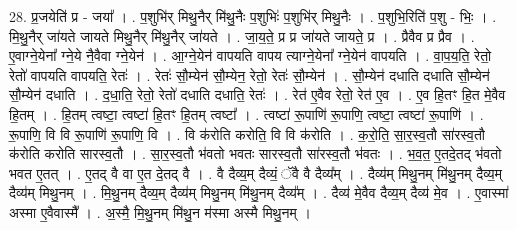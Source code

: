 \documentclass[17pt]{extarticle}
\begin{document}
28. प्र॒जयेति॑ प्र - जया᳚ । . प॒शुभि॑र् मिथु॒नैर् मि॑थु॒नैः प॒शुभिः॑ प॒शुभि॑र् मिथु॒नैः । . प॒शुभि॒रिति॑ प॒शु - भिः॒ । . मि॒थु॒नैर् जा॑यते जायते मिथु॒नैर् मि॑थु॒नैर् जा॑यते । . जा॒य॒ते॒ प्र प्र जा॑यते जायते॒ प्र । . प्रैवैव प्र प्रैव । . ए॒वाग्ने॒येना᳚ ग्ने॒ये नै॒वैवा ग्ने॒येन॑ । . आ॒ग्ने॒येन॑ वापयति वापय त्याग्ने॒येना᳚ ग्ने॒येन॑ वापयति । . वा॒प॒य॒ति॒ रेतो॒ रेतो॑ वापयति वापयति॒ रेतः॑ । . रेतः॑ सौ॒म्येन॑ सौ॒म्येन॒ रेतो॒ रेतः॑ सौ॒म्येन॑ । . सौ॒म्येन॑ दधाति दधाति सौ॒म्येन॑ सौ॒म्येन॑ दधाति । . द॒धा॒ति॒ रेतो॒ रेतो॑ दधाति दधाति॒ रेतः॑ । . रेत॑ ए॒वैव रेतो॒ रेत॑ ए॒व । . ए॒व हि॒तꣳ हि॒त मे॒वैव हि॒तम् । . हि॒तम् त्वष्टा॒ त्वष्टा॑ हि॒तꣳ हि॒तम् त्वष्टा᳚ । . त्वष्टा॑ रू॒पाणि॑ रू॒पाणि॒ त्वष्टा॒ त्वष्टा॑ रू॒पाणि॑ । . रू॒पाणि॒ वि वि रू॒पाणि॑ रू॒पाणि॒ वि । . वि क॑रोति करोति॒ वि वि क॑रोति । . क॒रो॒ति॒ सा॒र॒स्व॒तौ सा॑रस्व॒तौ क॑रोति करोति सारस्व॒तौ । . सा॒र॒स्व॒तौ भ॑वतो भवतः सारस्व॒तौ सा॑रस्व॒तौ भ॑वतः । . भ॒व॒त॒ ए॒तदे॒तद् भ॑वतो भवत ए॒तत् । . ए॒तद् वै वा ए॒त दे॒तद् वै । . वै दैव्य॒म् दैव्यं॒ ॅवै वै दैव्य᳚म् । . दैव्य॑म् मिथु॒नम् मि॑थु॒नम् दैव्य॒म् दैव्य॑म् मिथु॒नम् । . मि॒थु॒नम् दैव्य॒म् दैव्य॑म् मिथु॒नम् मि॑थु॒नम् दैव्य᳚म् । . दैव्य॑ मे॒वैव दैव्य॒म् दैव्य॑ मे॒व । . ए॒वास्मा॑ अस्मा ए॒वैवास्मै᳚ । . अ॒स्मै॒ मि॒थु॒नम् मि॑थु॒न म॑स्मा अस्मै मिथु॒नम् । \newline
\end{document}
